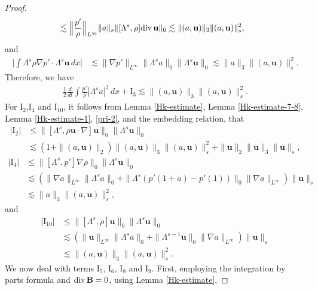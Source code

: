 \documentclass[12pt, reqno]{amsart}
\numberwithin{equation}{section}
\numberwithin{equation}{section}
\def\div{ \hbox{\rm div}\,  }
\numberwithin{equation}{section}
\numberwithin{equation}{section}
\theoremstyle{remark}
\def\div{ \hbox{\rm div}\,  }
\def\u{ \mathbf{u} }
\def\b{ \mathbf{B} }
\begin{document}
\begin{proof}
\begin{equation*}
\begin{split}
&\lesssim\Big\|\frac{p'}{\rho}\Big\|_{L^\infty}\|a\|_s\|[\Lambda^s,\rho]\div \u\|_0
\lesssim\|(a,\u)\|_{3}\|(a,\u)\|^2_s,
\end{split}\end{equation*}
and
\begin{equation*}\begin{split}
\Big|\int\Lambda^s\rho\nabla p'\cdot\Lambda^s\u \,dx\Big|
&\lesssim\|\nabla p'\|_{L^\infty}\|\Lambda^sa\|_0\|\Lambda^s\u\|_0\lesssim\|a\|_{3}\|(a,\u)\|^2_s.
\end{split}\end{equation*}
Therefore, we have
\begin{equation*}\begin{split}
\frac12\frac{d}{dt}\int\frac{p'}{\rho}|\Lambda^sa|^2\,dx+\textrm{I}_3\lesssim\|(a,\u)\|_3\|(a,\u)\|_s^2.
\end{split}\end{equation*}
For $\textrm{I}_2$,$\textrm{I}_4$ and $\textrm{I}_{10}$, it follows from
Lemma \ref{Hk-estimate}, Lemma \ref{Hk-estimate-7-8}, Lemma \ref{Hk-estimate-1}, \eqref{pri-2}, and the embedding relation, that
\begin{align*}
|\textrm{I}_{2}|&
\leq\|[\Lambda^s,\rho \u\cdot\nabla]\u\|_0\|\Lambda^s\u\|_0\\
&\lesssim(1+\|(a,\u)\|_2)\|(a,\u)\|_3\|(a, \u)\|^2_s+\|\u\|_2\|\u\|_3\|\u\|_s,
\end{align*}
\begin{align*}
|\textrm{I}_{4}|&
\leq\|[\Lambda^s,p']\nabla\rho\|_0\|\Lambda^s \u\|_0\\
&\lesssim(\|\nabla a\|_{L^\infty}\|\Lambda^sa\|_0+\|\Lambda^s(p'(1+a)-p'(1))\|_{0}\|\nabla a\|_{L^\infty})\| \u\|_s\\
&\lesssim\|a\|_{3}\|(a,\u)\|^2_s,
\end{align*}
and
\begin{align*}
|\textrm{I}_{10}|&
\leq\|[\Lambda^s,\rho]\u\|_0\|\Lambda^s\u\|_0\\
&\lesssim(\|\u\|_{L^\infty}\|\Lambda^sa\|_0+\|\Lambda^{s-1}\u\|_{0}\|\nabla a\|_{L^\infty})\|\u\|_s\\
&\lesssim\|(a,\u)\|_{3}\|(a,\u)\|^2_s.
\end{align*}
We now deal with terms $\textrm{I}_{5}$, $\textrm{I}_{6}$, $\textrm{I}_{8}$ and $\textrm{I}_{9}.$ First,  employing  the integration by
parts formula and  $\div \b=0$, using Lemma \ref{Hk-estimate}, %

\end{proof}
\end{document}
